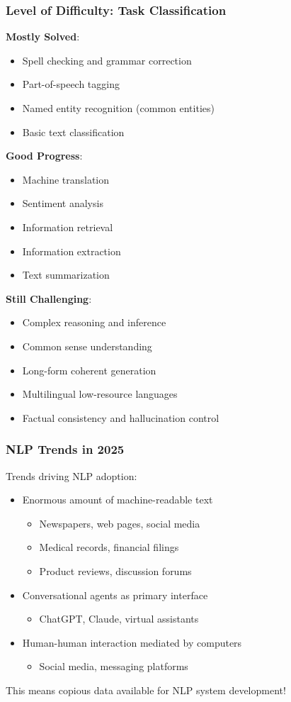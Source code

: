 \begin{frame}[fragile]\frametitle{Level of Difficulty: Task Classification}
\textbf{Mostly Solved}:
\begin{itemize}
\item Spell checking and grammar correction
\item Part-of-speech tagging
\item Named entity recognition (common entities)
\item Basic text classification
\end{itemize}

\textbf{Good Progress}:
\begin{itemize}
\item Machine translation
\item Sentiment analysis
\item Information retrieval
\item Information extraction
\item Text summarization
\end{itemize}

\textbf{Still Challenging}:
\begin{itemize}
\item Complex reasoning and inference
\item Common sense understanding
\item Long-form coherent generation
\item Multilingual low-resource languages
\item Factual consistency and hallucination control
\end{itemize}
\end{frame}


\begin{frame}[fragile]\frametitle{NLP Trends in 2025}
Trends driving NLP adoption:
\begin{itemize}
\item Enormous amount of machine-readable text
\begin{itemize}
\item Newspapers, web pages, social media
\item Medical records, financial filings
\item Product reviews, discussion forums
\end{itemize}
\item Conversational agents as primary interface
\begin{itemize}
\item ChatGPT, Claude, virtual assistants
\end{itemize}
\item Human-human interaction mediated by computers
\begin{itemize}
\item Social media, messaging platforms
\end{itemize}
\end{itemize}

This means copious data available for NLP system development!
\end{frame}

